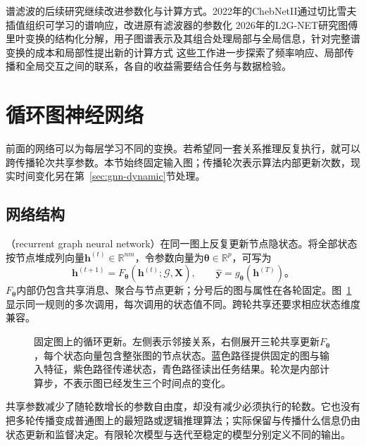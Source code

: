 谱滤波的后续研究继续改进参数化与计算方式。2022年的ChebNetII通过切比雪夫插值组织可学习的谱响应，改进原有滤波器的参数化 2026年的L2G-NET研究图傅里叶变换的结构化分解，用子图谱表示及其组合处理局部与全局信息，针对完整谱变换的成本和局部性提出新的计算方式 这些工作进一步探索了频率响应、局部传播和全局交互之间的联系，各自的收益需要结合任务与数据检验。

\section{循环图神经网络}
\label{sec:gnn-recurrent}

前面的网络可以为每层学习不同的变换。若希望同一套关系推理反复执行，就可以跨传播轮次共享参数。本节始终固定输入图；传播轮次表示算法内部更新次数，现实时间变化另在第~\ref{sec:gnn-dynamic}节处理。

\subsection{网络结构}
\label{sec:gnn-recurrent-structure}

（recurrent graph neural network）在同一图上反复更新节点隐状态。将全部状态按节点堆成列向量$\bm{h}^{(t)}\in\mathbb{R}^{nm}$，令参数向量为$\bm{\theta}\in\mathbb{R}^{p}$，可写为
\begin{equation}
  \bm{h}^{(t+1)}=F_{\bm{\theta}}(\bm{h}^{(t)};\mathcal{G},\bm{X}),
  \qquad \widehat{\bm{y}}=g_{\bm{\theta}}(\bm{h}^{(T)})\text{。}
  \label{eq:gnn-recurrent-update}
\end{equation}
$F_{\bm{\theta}}$内部仍包含共享消息、聚合与节点更新；分号后的图与属性在各轮固定。图~\ref{fig:gnn-recurrent}显示同一规则的多次调用，每次调用的状态值不同。跨轮共享还要求相应状态维度兼容。

\begin{figure}[htb]
  \centering
  
  \caption{固定图上的循环更新。左侧表示邻接关系，右侧展开三轮共享更新$F_{\bm{\theta}}$，每个状态向量包含整张图的节点状态。蓝色路径提供固定的图与输入特征，紫色路径传递状态，青色路径读出任务结果。轮次是内部计算步，不表示图已经发生三个时间点的变化。}
  \label{fig:gnn-recurrent}
\end{figure}

共享参数减少了随轮数增长的参数自由度，却没有减少必须执行的轮数。它也没有把多轮传播变成普通图上的最短路或逻辑推理算法；实际保留与传播什么信息仍由状态更新和监督决定。有限轮次模型与迭代至稳定的模型分别定义不同的输出。

